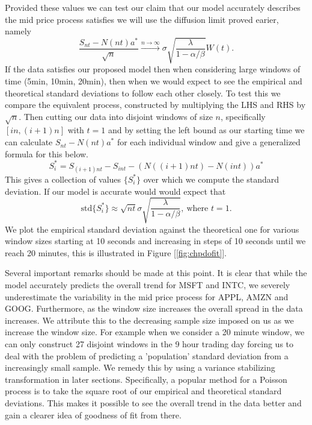 \documentclass{article}
\begin{document}
Provided these values we can test our claim that our model accurately describes the mid price process satisfies we will use the diffusion limit proved earier, namely
\begin{equation}
    \frac{S_{nt} - N(nt)a^*}{\sqrt{n}}\xrightarrow{n\to\infty} \sigma\sqrt{\frac{\lambda}{1-\alpha/\beta}}W(t).
\end{equation}
If the data satisfies our proposed model then when considering large windows of time (5min, 10min, 20min), then when we would expect to see the empirical and theoretical standard deviations to follow each other closely. To test this we compare the equivalent process, constructed by multiplying the LHS and RHS by $\sqrt{n}$. Then cutting our data into disjoint windows of size $n$, specifically $[in, (i+1)n]$ with $t = 1$ and by setting the left bound as our starting time we can calculate $S_{nt} - N(nt)a^*$ for each individual window and give a generalized formula for this below.
\begin{equation}\label{eq:S_star}
    S^*_{i} = S_{(i+1)nt} - S_{int} - (N((i+1)nt) - N(int))a^*
\end{equation}
 This gives a collection of values $\{S^*_i\}$ over which we compute the standard deviation. If our model is accurate would would expect that 
 \begin{equation}
    \text{std}\{S^*_i\} \approx \sqrt{nt}\sigma\sqrt{\frac{\lambda}{1-\alpha/\beta}},\ \text{where } t = 1.
 \end{equation}
 We plot the empirical standard deviation against the theoretical one for various window sizes starting at 10 seconds and increasing in steps of 10 seconds until we reach 20 minutes, this is illustrated in Figure [\ref{fig:chpdofit}].

Several important remarks should be made at this point. It is clear that while the model accurately predicts the overall trend for MSFT and INTC, we severely underestimate the variability in the mid price process for APPL, AMZN and GOOG. Furthermore, as the window size increases the overall spread in the data increases. We attribute this to the decreasing sample size imposed on us as we increase the window size. For example when we consider a 20 minute window, we can only construct 27 disjoint windows in the 9 hour trading day forcing us to deal with the problem of predicting a 'population' standard deviation from a increasingly small sample. We remedy this by using a variance stabilizing transformation in later sections. Specifically, a popular method for a Poisson process is to take the square root of our empirical and theoretical standard deviations. This makes it possible to see the overall trend in the data better and gain a clearer idea of goodness of fit from there.
\end{document}
